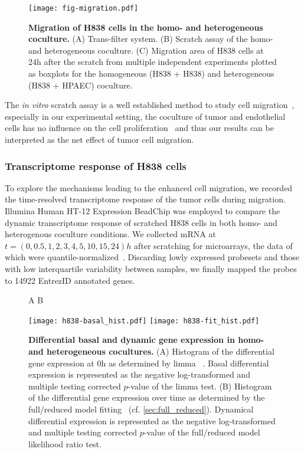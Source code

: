 \begin{figure}[!ht]
\begin{center}
\texttt{[image: fig-migration.pdf]}
\end{center}
\caption[H838 migration in homo- and heterogeneous coculture]{
{\bf Migration of H838 cells in the homo- and heterogeneous coculture.} 
(A) Trans-filter system. (B) Scratch assay of the homo- and heterogeneous coculture.
(C) Migration area of H838 cells at 24h after the scratch from multiple independent 
experiments 
plotted as 
boxplots for the homogeneous (H838 + H838) and heterogeneous (H838 + HPAEC) 
coculture.
}
\label{fig:migration}
\end{figure}

The \emph{in vitro} scratch assay is a well established method
to study cell migration~\citep{Busch2008,Liang2007}, especially
in our experimental setting, the coculture of tumor and 
endothelial cells has no influence on the cell proliferation~%
\citep{Dauscher2012} and thus our results can be interpreted
as the net effect of tumor cell migration.

\subsubsection{Transcriptome response of H838 cells}

To explore the mechanisms leading to the enhanced cell migration, we recorded the time-resolved transcriptome response of the tumor cells during migration.
Illumina Human HT-12 Expression BeadChip was employed to compare the dynamic transcriptome response of scratched H838 cells in both homo- and heterogenous coculture conditions.
We collected mRNA at $t=(0,0.5,1,2,3,4,5,10,15,24)h$ after scratching for microarrays,
the data of which were quantile-normalized~\citep{Dunning2008a}.  
Discarding lowly expressed probesets and those with low interquartile 
variability between samples, we finally mapped the probes to 14922 EntrezID 
annotated genes. 

\begin{figure}[!ht]
\hskip 0.5in A \hskip 2.5in B
\begin{center}
\texttt{[image: h838-basal\_hist.pdf]}
\texttt{[image: h838-fit\_hist.pdf]}
\end{center}
\caption[Differential basal and dynamic gene expression]{
{\bf Differential basal and dynamic gene expression in homo- and heterogeneous 
cocultures.} 
(A) Histogram of the differential gene expression at 0h as determined by limma~%
\citep{Smyth2004}. 
Basal differential expression is 
represented as the negative log-transformed and multiple
testing corrected $p$-value of the limma test.
(B) Histogram of the differential gene expression over time as determined by the
full/reduced model fitting~\citep{Mar2009} (cf. \ref{sec:full_reduced}).
Dynamical differential expression is 
represented as the negative log-transformed and multiple
testing corrected $p$-value of the full/reduced model
likelihood ratio test.
}
\label{fig:h838_transcriptome}
\end{figure}

